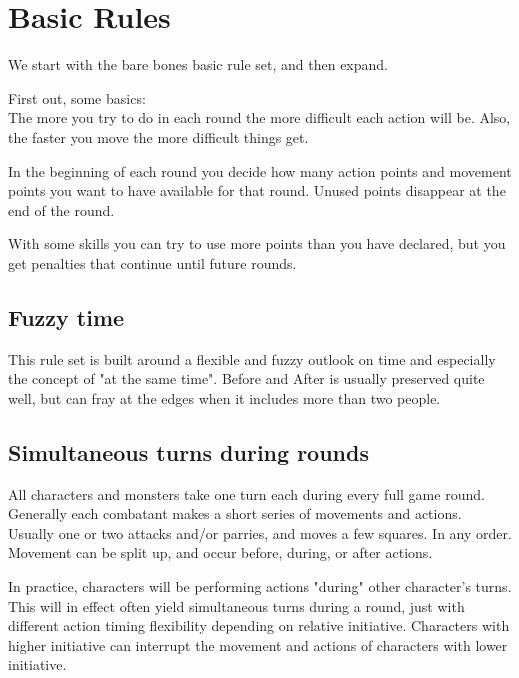
\section*{Basic Rules}

We start with the bare bones basic rule set, and then expand.

First out, some basics: \\
The more you try to do in each round the more difficult each action will be. Also, the faster you move the more difficult things get.

In the beginning of each round you decide how many action points and movement points you want to have available for that round. Unused points disappear at the end of the round.

With some skills you can try to use more points than you have declared, but you get penalties that continue until future rounds.


\subsection*{Fuzzy time}
This rule set is built around a flexible and fuzzy outlook on time and especially the concept of "at the same time". Before and After is usually preserved quite well, but can fray at the edges when it includes more than two people.


\subsection*{Simultaneous turns during rounds}
All characters and monsters take one turn each during every full game round. Generally each combatant makes a short series of movements and actions. Usually one or two attacks and/or parries, and moves a few squares. In any order. Movement can be split up, and occur before, during, or after actions.

In practice, characters will be performing actions "during" other character's turns. This will in effect often yield simultaneous turns during a round, just with different action timing flexibility depending on relative initiative. Characters with higher initiative can interrupt the movement and actions of characters with lower initiative.


